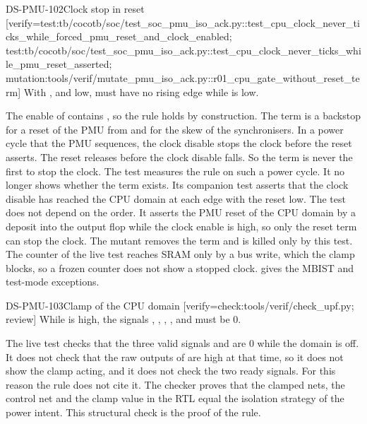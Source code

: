 \begin{requirement}{DS-PMU-102}{Clock stop in reset}
[verify={test:tb/cocotb/soc/test_soc_pmu_iso_ack.py::test_cpu_clock_never_ticks_while_forced_pmu_reset_and_clock_enabled; test:tb/cocotb/soc/test_soc_pmu_iso_ack.py::test_cpu_clock_never_ticks_while_pmu_reset_asserted; mutation:tools/verif/mutate_pmu_iso_ack.py::r01_cpu_gate_without_reset_term}]
With ,  and  low,  must have no rising edge while  is low.
\end{requirement}
\begin{information}
The enable of  contains , so the rule holds by construction. The term is a backstop for a reset of the PMU from  and for the skew of the synchronisers. In a power cycle that the PMU sequences, the clock disable stops the clock before the reset asserts. The reset releases before the clock disable falls. So the term is never the first to stop the clock. The test  measures the rule on such a power cycle. It no longer shows whether the term exists. Its companion test  asserts that the clock disable has reached the CPU domain at each edge with the reset low. The test  does not depend on the order. It asserts the PMU reset of the CPU domain by a deposit into the output flop while the clock enable is high, so only the reset term can stop the clock. The mutant  removes the term and is killed only by this test. The counter of the live test reaches SRAM only by a bus write, which the clamp blocks, so a frozen counter does not show a stopped clock.  gives the MBIST and test-mode exceptions.
\end{information}

\begin{requirement}{DS-PMU-103}{Clamp of the CPU domain}
[verify={check:tools/verif/check_upf.py; review}]
While  is high, the signals , , , ,  and  must be 0.
\end{requirement}
\begin{information}
The live test  checks that the three valid signals and  are 0 while the domain is off. It does not check that the raw outputs of  are high at that time, so it does not show the clamp acting, and it does not check the two ready signals. For this reason the rule does not cite it. The checker  proves that the clamped nets, the control net and the clamp value in the RTL equal the isolation strategy of the power intent. This structural check is the proof of the rule.
\end{information}

